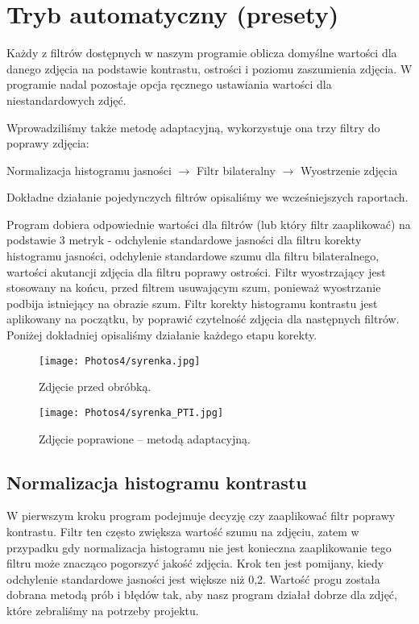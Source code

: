 \documentclass[]{mwart}
\begin{document}
\section{Tryb automatyczny (presety)}
Każdy z filtrów dostępnych w naszym programie oblicza domyślne
wartości dla danego zdjęcia na podstawie kontrastu, ostrości i
poziomu zaszumienia zdjęcia.
W programie nadal pozostaje opcja ręcznego ustawiania wartości
dla niestandardowych zdjęć.

Wprowadziliśmy także metodę adaptacyjną, wykorzystuje ona trzy
filtry do poprawy zdjęcia:
\begin{center}
    Normalizacja histogramu jasności $\to$ Filtr bilateralny $\to$ Wyostrzenie zdjęcia
\end{center}

Dokładne działanie pojedynczych filtrów opisaliśmy we wcześniejszych raportach.

Program dobiera odpowiednie wartości dla filtrów (lub który filtr zaaplikować)
na podstawie 3 metryk - odchylenie standardowe jasności dla filtru
korekty histogramu jasności, odchylenie standardowe szumu dla
filtru bilateralnego, wartości akutancji zdjęcia dla filtru
poprawy ostrości. Filtr wyostrzający jest stosowany na końcu,
przed filtrem usuwającym szum,
ponieważ wyostrzanie podbija istniejący na obrazie szum.
Filtr korekty histogramu kontrastu jest aplikowany na początku,
by poprawić czytelność zdjęcia dla następnych filtrów.
Poniżej dokładniej opisaliśmy działanie każdego etapu korekty.

\newpage

\begin{figure}[H]
    \centering
    \texttt{[image: Photos4/syrenka.jpg]}
    \caption{Zdjęcie przed obróbką.}
\end{figure}
\begin{figure}[H]
    \centering
    \texttt{[image: Photos4/syrenka\_PTI.jpg]}
    \caption{Zdjęcie poprawione -- metodą adaptacyjną.}
\end{figure}

\vfill
\subsection{Normalizacja histogramu kontrastu}
W pierwszym kroku program podejmuje decyzję czy zaaplikować filtr
poprawy kontrastu. Filtr ten często zwiększa wartość szumu na zdjęciu,
zatem w przypadku gdy normalizacja histogramu nie jest konieczna
zaaplikowanie tego filtru może znacząco pogorszyć jakość zdjęcia.
Krok ten jest pomijany, kiedy odchylenie standardowe jasności
jest większe niż 0,2. Wartość progu została dobrana metodą prób
i błędów tak, aby nasz program działał dobrze dla zdjęć, które
zebraliśmy na potrzeby projektu.
\end{document}
